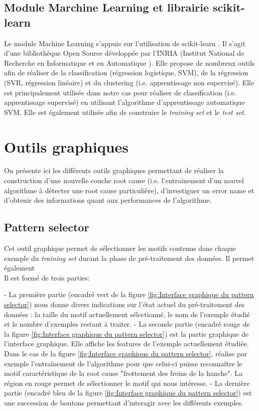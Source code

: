 \subsection{Module Marchine Learning et librairie scikit-learn}
\label{Industrialisation du produit:  API: Le module Machine Learning}
Le module Machine Learning s'appuie sur l'utilisation de scikit-learn \cite{ScikitLearn}. Il s'agit d'une bibliothèque Open Source développée par l'INRIA (Institut National de Recherche en Informatique et en Automatique \cite{INRIA}). Elle propose de nombreux outils afin de réaliser de la classification (régression logistique, SVM), de la régression (SVR, régression linéaire) et du clustering (i.e. apprentissage non supervisé). Elle est principalement utilisée dans notre cas pour réaliser de classification (i.e. apprentissage supervisé) en utilisant l'algorithme d'apprentissage automatique SVM. Elle est également utilisée afin de construire le \emph{training set} et le \emph{test set}.




\section{Outils graphiques}
\label{Industrialisation du produit: Outils graphiques}
On présente ici les différents outils graphiques permettant de réaliser la construction d'une nouvelle couche root cause (i.e. l'entrainement d'un nouvel algorithme à détecter une root cause particulière), d'investiguer un error name et d'obtenir des informations quant aux performances de l'algorithme. 

\subsection{Pattern selector}
\label{Industrialisation du produit: Outils graphiques: Pattern selection}
Cet outil graphique permet de sélectionner les motifs contenus dans chaque exemple du \emph{training set} durant la phase de pré-traitement des données.  Il permet également \\
Il est formé de trois parties:
\begin{item}
	- La première partie (encadré vert de la figure \ref{fig:Interface graphique du pattern selector}) nous donne divers indications sur l'état actuel du pré-traitement des données : la taille du motif actuellement sélectionné, le nom de l'exemple étudié et le nombre d'exemples restant à traiter. 
	- La seconde partie (encadré rouge de la figure  \ref{fig:Interface graphique du pattern selector}) est la partie graphique de l'interface graphique. Elle affiche les features de l'exemple actuellement étudiée. Dans le cas de la figure  \ref{fig:Interface graphique du pattern selector}, réalise par exemple l'entraînement de l'algorithme pour  que celui-ci puisse reconnaître le motif caractéristique de la root cause "frottement des freins de la hanche". La région en rouge permet de sélectionner le motif qui nous intéresse.
	- La dernière partie (encadré bleu de la figure  \ref{fig:Interface graphique du pattern selector}) est une succession de boutons permettant d'interagir avec les différents exemples.  
\end{item} 

